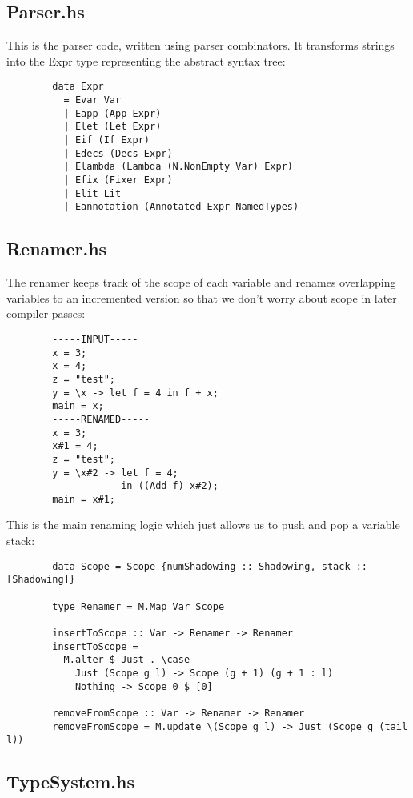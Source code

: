 \documentclass{article} %
\begin{document}
    \subsection{Parser.hs}
    This is the parser code, written using parser combinators. It transforms strings into the Expr type representing the abstract syntax tree:
    \begin{verbatim}
        data Expr
          = Evar Var
          | Eapp (App Expr)
          | Elet (Let Expr)
          | Eif (If Expr)
          | Edecs (Decs Expr)
          | Elambda (Lambda (N.NonEmpty Var) Expr)
          | Efix (Fixer Expr)
          | Elit Lit
          | Eannotation (Annotated Expr NamedTypes)
    \end{verbatim}
    \subsection{Renamer.hs}
    The renamer keeps track of the scope of each variable and renames overlapping variables to an incremented version so that we don't worry about scope in later compiler passes:
    \begin{verbatim}
        -----INPUT-----
        x = 3;
        x = 4;
        z = "test";
        y = \x -> let f = 4 in f + x;
        main = x;
        -----RENAMED-----
        x = 3;
        x#1 = 4;
        z = "test";
        y = \x#2 -> let f = 4;
                    in ((Add f) x#2);
        main = x#1;
    \end{verbatim}
    \newpage
    This is the main renaming logic which just allows us to push and pop a variable stack:
    \begin{verbatim}
        data Scope = Scope {numShadowing :: Shadowing, stack :: [Shadowing]}
        
        type Renamer = M.Map Var Scope
        
        insertToScope :: Var -> Renamer -> Renamer
        insertToScope =
          M.alter $ Just . \case
            Just (Scope g l) -> Scope (g + 1) (g + 1 : l)
            Nothing -> Scope 0 $ [0]
        
        removeFromScope :: Var -> Renamer -> Renamer
        removeFromScope = M.update \(Scope g l) -> Just (Scope g (tail l))
    \end{verbatim}
    
    \subsection{TypeSystem.hs}
    
\end{document}
